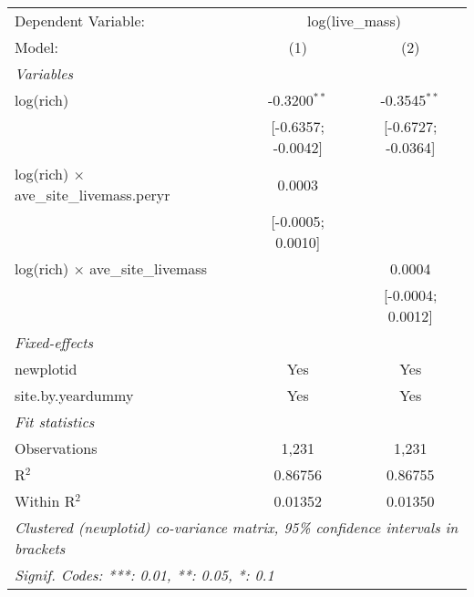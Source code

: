 \begin{tabular}{lcc}
\tabularnewline\midrule\midrule
Dependent Variable:&\multicolumn{2}{c}{log(live\_mass)}\\
Model:&(1) & (2)\\
\midrule \emph{Variables}&   &  \\
log(rich) & -0.3200$^{**}$ & -0.3545$^{**}$\\
  &[-0.6357; -0.0042] & [-0.6727; -0.0364]\\
log(rich) $\times $ ave\_site\_livemass.peryr & 0.0003 &   \\
  &[-0.0005; 0.0010] &   \\
log(rich) $\times $ ave\_site\_livemass &    & 0.0004\\
  &   & [-0.0004; 0.0012]\\
\midrule \emph{Fixed-effects}&   &  \\
newplotid & Yes & Yes\\
site.by.yeardummy & Yes & Yes\\
\midrule \emph{Fit statistics}&  & \\
Observations & 1,231&1,231\\
R$^2$ & 0.86756&0.86755\\
Within R$^2$ & 0.01352&0.01350\\
\midrule\midrule\multicolumn{3}{l}{\emph{Clustered (newplotid) co-variance matrix, 95\% confidence intervals in brackets}}\\
\multicolumn{3}{l}{\emph{Signif. Codes: ***: 0.01, **: 0.05, *: 0.1}}\\
\end{tabular}


